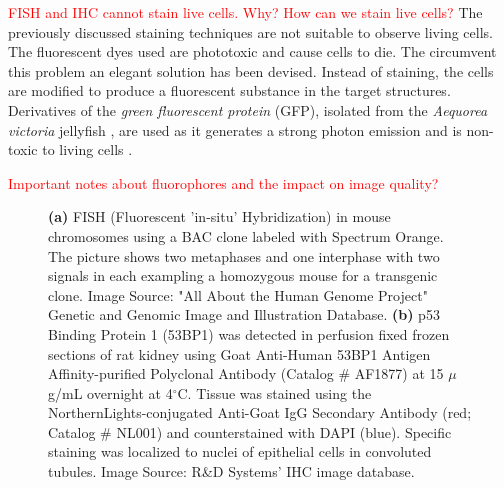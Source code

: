 \begin{definition}
	\textcolor{red}{FISH and IHC cannot stain live cells. Why? How can we stain live cells?}
	The previously discussed staining techniques are not suitable to observe living cells.
	The fluorescent dyes used are phototoxic and cause cells to die. The circumvent this problem an elegant solution has been devised.
	Instead of staining, the cells are modified to produce a fluorescent substance in the target structures.
	Derivatives of the \textit{green fluorescent protein} (GFP), isolated from the \textit{Aequorea victoria} jellyfish \citep{Tsien1998,LichtmanConchello2005,Fatima2008}, are used as it generates a strong photon emission and is non-toxic to living cells \citep{Danek2012,Hubeny2008,Dobrucki2013}.
\end{definition}

\textcolor{red}{Important notes about fluorophores and the impact on image quality?}

\begin{figure}[!t]
	\centering
	\caption{\textbf{(a)} FISH (Fluorescent 'in-situ' Hybridization) in mouse chromosomes using a BAC clone labeled with Spectrum Orange. The picture shows two metaphases and one interphase with two signals in each exampling a homozygous mouse for a transgenic clone. Image Source: "All About the Human Genome Project" Genetic and Genomic Image and Illustration Database. %
	\textbf{(b)} p53 Binding Protein 1 (53BP1) was detected in perfusion fixed frozen sections of rat kidney using Goat Anti-Human 53BP1 Antigen Affinity-purified Polyclonal Antibody (Catalog \# AF1877) at 15 $\mu$g/mL overnight at 4$^{\circ}$C. Tissue was stained using the NorthernLights-conjugated Anti-Goat IgG Secondary Antibody (red; Catalog \# NL001) and counterstained with DAPI (blue). Specific staining was localized to nuclei of epithelial cells in convoluted tubules. Image Source: R\&D Systems' IHC image database.}
	\label{fig:stainingtechniques}
\end{figure}

